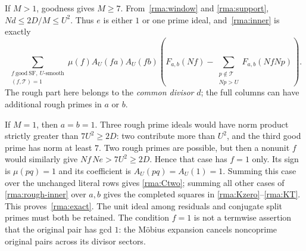 If $M>1$, goodness gives $M\ge7$. From~\eqref{rma:window} and
\eqref{rma:support}, $Nd\le2D/M\le U^2$. Thus $e$ is either $1$ or
one prime ideal, and~\eqref{rma:inner} is exactly
\begin{equation}\label{rma:rough-inner}
 \sum_{\substack{f\ \mathrm{good\ SF},\ U\text{-smooth}\\
                  (f,\mathcal T)=1}}
 \mu(f)A_U(fa)A_U(fb)
 \left(F_{a,b}(Nf)-
       \sum_{\substack{p\notin\mathcal T\\Np>U}}
                       F_{a,b}(NfNp)\right).
\end{equation}
The rough part here belongs to the \emph{common divisor} $d$; the full
columns can have additional rough primes in $a$ or $b$.

If $M=1$, then $a=b=1$. Three rough prime ideals would have norm product
strictly greater than $7U^2\ge2D$: two contribute more than $U^2$, and
the third good prime has norm at least $7$. Two rough primes are
possible, but then a nonunit $f$ would similarly give
$Nf\,Ne>7U^2\ge2D$. Hence that case has $f=1$ only. Its sign is
$\mu(pq)=1$ and its coefficient is $A_U(pq)=A_U(1)=1$.
Summing this case over the unchanged literal rows gives
\eqref{rma:Ctwo}; summing all other cases of
\eqref{rma:rough-inner} over $a,b$ gives the completed squares in
\eqref{rma:Kzero}--\eqref{rma:KT}. This proves~\eqref{rma:exact}.
The unit ideal among residuals and conjugate split primes must both be
retained. The condition $f=1$ is not a termwise assertion that the
original pair has gcd $1$: the M\"obius expansion cancels noncoprime
original pairs across its divisor sectors.

